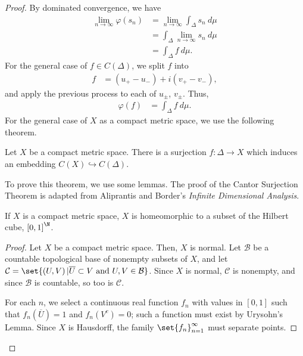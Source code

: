 \documentclass[10pt]{mypackage}
\begin{document}
\begin{proof}
  By dominated convergence, we have
  \begin{align*}
    \lim_{n\rightarrow\infty}\varphi\left(s_n\right) &= \lim_{n\rightarrow\infty}\int_{\Delta}^{} s_n\:d\mu\\
                                                     &= \int_{\Delta}^{} \lim_{n\rightarrow\infty}s_n\:d\mu\\
                                                     &= \int_{\Delta}^{} f\:d\mu.
  \end{align*}
  For the general case of $f\in C\left(\Delta\right)$, we split $f$ into
  \begin{align*}
    f &= \left(u_{+} - u_{-}\right) + i\left(v_{+} - v_{-}\right),
  \end{align*}
  and apply the previous process to each of $u_{\pm}$, $v_{\pm}$. Thus,
  \begin{align*}
    \varphi(f) &= \int_{\Delta}^{} f\:d\mu.
  \end{align*}
  For the general case of $X$ as a compact metric space, we use the following theorem.
  \begin{theorem}
    Let $X$ be a compact metric space. There is a surjection $f: \Delta \rightarrow X$ which induces an embedding $C(X) \hookrightarrow C\left(\Delta\right)$.
  \end{theorem}
  To prove this theorem, we use some lemmas. The proof of the Cantor Surjection Theorem is adapted from Aliprantis and Border's \textit{Infinite Dimensional Analysis}.
  \begin{lemma}
    If $X$ is a compact metric space, $X$ is homeomorphic to a subset of the Hilbert cube, $\left[0,1\right]^{\N}$.
  \end{lemma}
  \begin{proof}
    Let $X$ be a compact metric space. Then, $X$ is normal. Let $\mathcal{B}$ be a countable topological base of nonempty subsets of $X$, and let $\mathcal{C} = \set{\left(U,V\right)| \overline{U}\subset V\text{ and }U,V\in \mathcal{B}}$. Since $X$ is normal, $\mathcal{C}$ is nonempty, and since $\mathcal{B}$ is countable, so too is $\mathcal{C}$.\newline

    For each $n$, we select a continuous real function $f_n$ with values in $[0,1]$ such that $f_n\left(\overline{U}\right) = 1$ and $f_n\left(V^{c}\right) = 0$; such a function must exist by Urysohn's Lemma. Since $X$ is Hausdorff, the family $\set{f_n}_{n=1}^{\infty}$ must separate points.\newline


\end{proof}
\end{proof}
\end{document}
